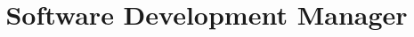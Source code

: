 \documentclass[11pt,a4paper,sans]{moderncv}        %
\title{Software Development Manager}                               %
\begin{document}
\makecvtitle



%


%
%
\end{document}
